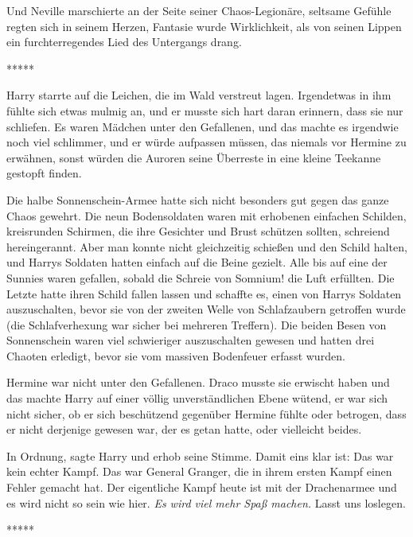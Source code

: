 Und Neville marschierte an der Seite seiner Chaos-Legionäre, seltsame Gefühle
regten sich in seinem Herzen, Fantasie wurde Wirklichkeit, als von seinen Lippen
ein furchterregendes Lied des Untergangs drang.

\begin{center}*****\end{center}

Harry starrte auf die Leichen, die im Wald verstreut lagen. Irgendetwas in ihm
fühlte sich etwas mulmig an, und er musste sich hart daran erinnern, dass sie
nur schliefen. Es waren Mädchen unter den Gefallenen, und das machte es
irgendwie noch viel schlimmer, und er würde aufpassen müssen, das niemals vor
Hermine zu erwähnen, sonst würden die Auroren seine Überreste in eine kleine
Teekanne gestopft finden.

Die halbe Sonnenschein-Armee hatte sich nicht besonders gut gegen das ganze
Chaos gewehrt. Die neun Bodensoldaten waren mit erhobenen einfachen Schilden,
kreisrunden Schirmen, die ihre Gesichter und Brust schützen sollten, schreiend
hereingerannt. Aber man konnte nicht gleichzeitig schießen und den Schild
halten, und Harrys Soldaten hatten einfach auf die Beine gezielt. Alle bis auf
eine der Sunnies waren gefallen, sobald die Schreie von \glqq{}Somnium!\grqq{}
die Luft erfüllten. Die Letzte hatte ihren Schild fallen lassen und schaffte es,
einen von Harrys Soldaten auszuschalten, bevor sie von der zweiten Welle von
Schlafzaubern getroffen wurde (die Schlafverhexung war sicher bei mehreren
Treffern). Die beiden Besen von Sonnenschein waren viel schwieriger
auszuschalten gewesen und hatten drei Chaoten erledigt, bevor sie vom massiven
Bodenfeuer erfasst wurden.

Hermine war nicht unter den Gefallenen. Draco musste sie erwischt haben und das
machte Harry auf einer völlig unverständlichen Ebene wütend, er war sich nicht
sicher, ob er sich beschützend gegenüber Hermine fühlte oder betrogen, dass er
nicht derjenige gewesen war, der es getan hatte, oder vielleicht beides.

\glqq{}In Ordnung\grqq{}, sagte Harry und erhob seine Stimme. \glqq{}Damit eins
klar ist: Das war kein echter Kampf. Das war General Granger, die in ihrem
ersten Kampf einen Fehler gemacht hat. Der eigentliche Kampf heute ist mit der
Drachenarmee und es wird nicht so sein wie hier. \emph{Es wird viel mehr Spaß
machen.} Lasst uns loslegen.\grqq{}

\begin{center}*****\end{center}

